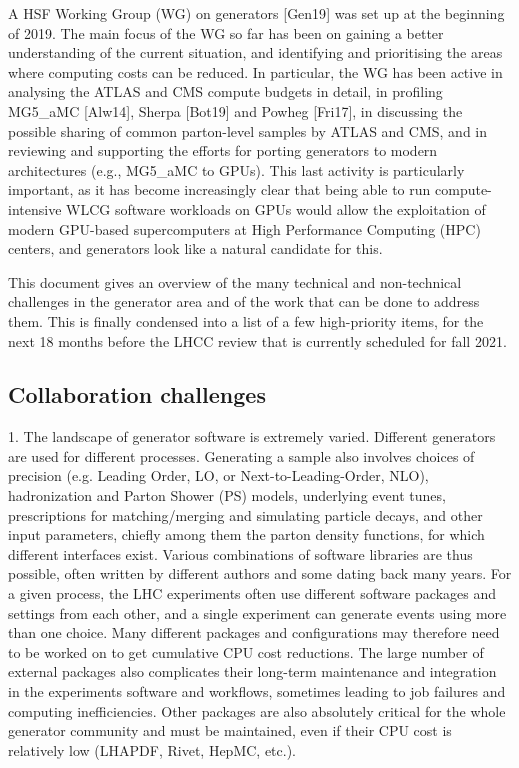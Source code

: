 \documentclass[11pt,a4paper]{article}
\begin{document}
A HSF Working Group (WG) on generators {[}Gen19{]} was set up at the
beginning of 2019. The main focus of the WG so far has been on gaining a
better understanding of the current situation, and identifying and
prioritising the areas where computing costs can be reduced. In
particular, the WG has been active in analysing the ATLAS and CMS
compute budgets in detail, in profiling MG5\_aMC {[}Alw14{]}, Sherpa
{[}Bot19{]} and Powheg {[}Fri17{]}, in discussing the possible sharing
of common parton-level samples by ATLAS and CMS, and in reviewing and
supporting the efforts for porting generators to modern architectures
(e.g., MG5\_aMC to GPUs). This last activity is particularly important,
as it has become increasingly clear that being able to run
compute-intensive WLCG software workloads on GPUs would allow the
exploitation of modern GPU-based supercomputers at High Performance
Computing (HPC) centers, and generators look like a natural candidate
for this.

This document gives an overview of the many technical and non-technical
challenges in the generator area and of the work that can be done to
address them. This is finally condensed into a list of a few
high-priority items, for the next 18 months before the LHCC review that
is currently scheduled for fall 2021.

\hypertarget{collaboration-challenges}{%
\subsection{Collaboration challenges}\label{collaboration-challenges}}

1. {The landscape of generator software is extremely varied}. Different
generators are used for different processes. Generating a sample also
involves choices of precision (e.g. Leading Order, LO, or
Next-to-Leading-Order, NLO), hadronization and Parton Shower (PS)
models, underlying event tunes, prescriptions for matching/merging and
simulating particle decays, and other input parameters, chiefly among
them the parton density functions, for which different interfaces exist.
Various combinations of software libraries are thus possible, often
written by different authors and some dating back many years. For a
given process, the LHC experiments often use different software packages
and settings from each other, and a single experiment can generate
events using more than one choice. Many different packages and
configurations may therefore need to be worked on to get cumulative CPU
cost reductions. The large number of external packages also complicates
their long-term maintenance and integration in the experiments software
and workflows, sometimes leading to job failures and computing
inefficiencies. Other packages are also absolutely critical for the
whole generator community and must be maintained, even if their CPU cost
is relatively low (LHAPDF, Rivet, HepMC, etc.).
\end{document}
